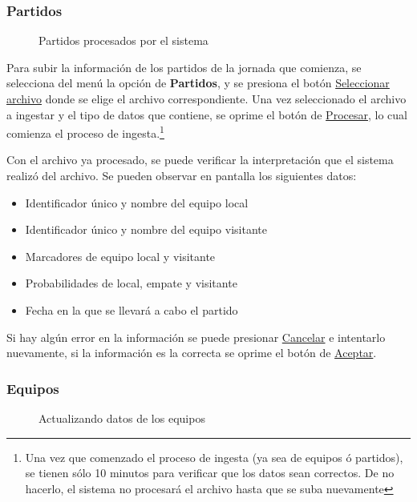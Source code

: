 \subsubsection{Partidos}
\begin{figure}[!htb]\centering
   \begin {minipage}{1\textwidth}
     \caption{Partidos procesados por el sistema}
	 \label{Fig:partidos}
   \end{minipage}
\end{figure}

Para subir la información de los partidos de la jornada que comienza, se selecciona del menú la opción de \textbf{Partidos}, y se presiona el botón \underline{Seleccionar archivo} donde se elige el archivo correspondiente.
Una vez seleccionado el archivo a ingestar y el tipo de datos que contiene, se oprime el botón de \underline{Procesar}, lo cual comienza el proceso de ingesta.\footnote{Una vez que comenzado el proceso de ingesta (ya sea de equipos ó partidos), se tienen sólo 10 minutos para verificar que los datos sean correctos. De no hacerlo, el sistema no procesará el archivo hasta que se suba nuevamente}

Con el archivo ya procesado, se puede verificar la interpretación que el sistema realizó del archivo. Se pueden observar en pantalla los siguientes datos:
\begin{itemize}
\item Identificador único y nombre del equipo local
\item Identificador único y nombre del equipo visitante
\item Marcadores de equipo local y visitante
\item Probabilidades de local, empate y visitante
\item Fecha en la que se llevará a cabo el partido
\end{itemize}

Si hay algún error en la información se puede presionar \underline{Cancelar} e intentarlo nuevamente, si la información es la correcta se oprime el botón de \underline{Aceptar}.


\subsubsection{Equipos}
\begin{figure}[!htb]\centering
   \begin {minipage}{1\textwidth}
     \caption{Actualizando datos de los equipos}
	 \label{Fig:equipos}
   \end{minipage}
\end{figure}

